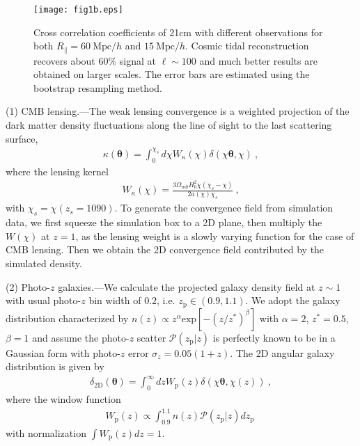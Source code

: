 \documentclass[aps,prl,twocolumn,showpacs,superscriptaddress,groupedaddress,nofootinbib]{revtex4}  %
\newcommand{\mr}{\mathrm}
\begin{document}
\begin{figure}[tbp]
\begin{center}
\texttt{[image: fig1b.eps]}
\end{center}
\vspace{-0.7cm}
\caption{Cross correlation coefficients of 21cm with 
different observations for both $R_\parallel=60\ \mr{Mpc}/h$ and 
$15\ \mr{Mpc}/h$. Cosmic tidal reconstruction recovers 
about 60\% signal at $\ell\sim100$ and much better results are obtained on 
larger scales. The error bars are estimated using the bootstrap resampling 
method.}
\label{fig:cc}
\end{figure}


(1) CMB lensing.---The weak lensing convergence is a weighted projection
of the dark matter density fluctuations along the line of sight to the last 
scattering surface,
\begin{eqnarray}
\kappa(\bm{\theta})=\int_0^{\chi_s}d\chi 
W_\kappa(\chi)\delta(\chi\bm{\theta},\chi)\ ,
\end{eqnarray}
where the lensing kernel
\begin{eqnarray}
W_\kappa(\chi)=\frac{3\Omega_{m0}H_0^2\chi(\chi_s-\chi)}{2a(\chi)\chi_s}\ ,
\end{eqnarray}
with $\chi_s=\chi(z_s=1090)$.
To generate the convergence field from simulation data, we first squeeze the 
simulation box to a 2D plane, then multiply the $W(\chi)$ at $z=1$, as the 
lensing weight is a slowly varying function for the case of CMB lensing.
Then we obtain the 2D convergence field contributed by the simulated density.

(2) Photo-$z$ galaxies.---We calculate the projected galaxy density field at 
$z\sim 1$ with usual photo-$z$ bin width of $0.2$, i.e. $z_\mr{p}\in(0.9,1.1)$. 
We adopt the galaxy distribution characterized by 
$n(z)\propto z^{\alpha}\mr{exp}[-(z/z^{*})^\beta]$
with $\alpha=2$, $z^*=0.5$, $\beta=1$
and assume the photo-$z$ scatter $\mathcal{P}(z_\mr{p}|z)$ is perfectly known to be in a Gaussian form with photo-$z$ error $\sigma_z=0.05(1+z)$.
The 2D angular galaxy distribution is given by
\begin{eqnarray}
\delta_\mr{2D}(\bm{\theta})=\int_0^\infty dzW_\mr{p}(z)
\delta(\chi\bm{\theta},\chi(z))\ ,
\end{eqnarray}
where the window function 
\begin{eqnarray}
W_\mr{p}(z)\propto\int_{0.9}^{1.1} n(z) \mathcal{P}(z_\mr{p}|z) dz_\mr{p}\ 
\end{eqnarray}
with normalization $\int W_\mr{p}(z)dz=1$.
\end{document}
